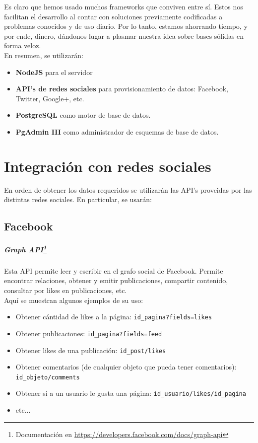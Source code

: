 \documentclass[oneside]{book}
\begin{document}
Es claro que hemos usado muchos frameworks que conviven entre s\'{i}. Estos nos facilitan el desarrollo al contar con soluciones previamente codificadas a problemas conocidos y de uso diario. Por lo tanto, estamos ahorrando tiempo, y por ende, dinero, d\'{a}ndonos lugar a plasmar nuestra idea sobre bases s\'{o}lidas en forma veloz. \\


En resumen, se utilizar\'{a}n:
	
	\begin{itemize}
		\item \textbf{NodeJS} para el servidor 
		\item \textbf{API's de redes sociales} para provisionamiento de datos: Facebook, Twitter, Google+, etc.
		\item \textbf{PostgreSQL} como motor de base de datos.
		\item \textbf{PgAdmin III} como administrador de esquemas de base de datos.
		
	\end{itemize}
	
\newpage



\section{Integración con redes sociales}

En orden de obtener los datos requeridos se utilizarán las API's proveidas por las distintas redes sociales. En particular, se usarán:

\subsection{Facebook}


	\subparagraph*{Graph API\footnote{Documentaci\'{o}n en \url{https://developers.facebook.com/docs/graph-api}}}
	
	Esta API permite leer y escribir en el grafo social de Facebook.
	Permite encontrar relaciones, obtener y emitir publicaciones, compartir contenido, consultar por likes en publicaciones, etc.\\
	
	Aqu\'{i} se muestran algunos ejemplos de su uso:\\
	
	\begin{itemize}
  		\item Obtener c\'{a}ntidad de likes a la p\'{a}gina: \texttt{id\_pagina?fields=likes}
  		\item Obtener publicaciones: \texttt{id\_pagina?fields=feed}
  		\item Obtener likes de una publicaci\'{o}n: \texttt{id\_post/likes}
  		\item Obtener comentarios (de cualquier objeto que pueda tener comentarios): \texttt{id\_objeto/comments}
  		\item Obtener si a un usuario le gusta una p\'{a}gina: \texttt{id\_usuario/likes/id\_pagina}
  		\item etc...
	\end{itemize}
	
\end{document}
